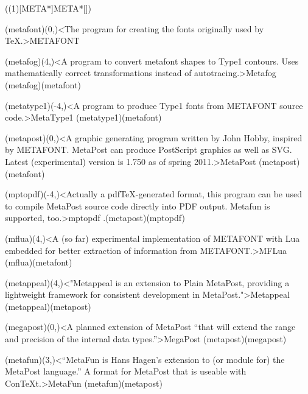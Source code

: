 \tograph(\tostruct(1)[META*]{META*}[\program]){
	\tonode(metafont)(0,\layer)<The program for creating the fonts originally used by TeX.>{METAFONT}
	\steplayer

	\tonode(metafog)(4,\layer)<A program to convert metafont shapes to Type1 contours. Uses mathematically correct transformations instead of autotracing.>{Metafog}
	\todraw(metafog)(metafont)

	\tonode(metatype1)(-4,\layer)<A program to produce Type1 fonts from METAFONT source code.>{MetaType1}
	\todraw(metatype1)(metafont)
	\steplayer[-1]

	\tonode(metapost)(0,\layer)<A graphic generating program written by John Hobby, inspired by METAFONT. MetaPost can produce PostScript graphics as well as SVG. Latest (experimental) version is 1.750 as of spring 2011.>{MetaPost}
	\todraw(metapost)(metafont)
	\steplayer[-1]

	\tonode[\normalimportant](mptopdf)(-4,\layer)<Actually a pdfTeX-generated format, this program can be used to compile MetaPost source code directly into PDF output. Metafun is supported, too.>{mptopdf}
	\todraw.(metapost)(mptopdf)

	\tonode[\experimental](mflua)(4,\layer)<A (so far) experimental implementation of METAFONT with Lua embedded for better extraction of information from METAFONT.>{MFLua}
	\todraw(mflua)(metafont)
	\steplayer[-2]

	\tonode[\normalimportant](metappeal)(4,\layer)<"Metappeal is an extension to Plain MetaPost, providing a lightweight framework 
for consistent development in MetaPost.">{Metappeal}
	\todraw(metappeal)(metapost)
	\steplayer[-1]

	\tonode[\experimental](megapost)(0,\layer)<A planned extension of MetaPost “that will extend the range
and precision of the internal data types.”>{MegaPost}
	\todraw(metapost)(megapost)
	\steplayer[-1]

	\tonode[\normalimportant](metafun)(3,\layer)<“MetaFun is Hans Hagen's extension to (or module for) the MetaPost language.” A format for MetaPost that is useable with ConTeXt.>{MetaFun}
	\todraw(metafun)(metapost)
}

